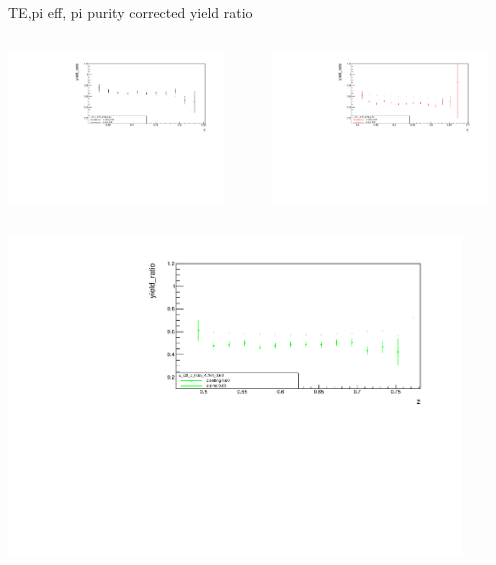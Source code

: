 \begin{frame}{TE,pi eff, pi purity corrected yield ratio}
\begin{columns}
\begin{column}[T]{0.5\textwidth}
\includegraphics[width = 0.9\textwidth]{results/yield/statistics_corr/x_Q2_z_55_4764_40_ratio.pdf}
\end{column}
\begin{column}[T]{0.5\textwidth}
\includegraphics[width = 0.9\textwidth]{results/yield/statistics_corr/x_Q2_z_55_4764_50_ratio.pdf}
\end{column}
\end{columns}
\begin{columns}
\begin{column}[T]{0.5\textwidth}
\includegraphics[width = 0.9\textwidth]{results/yield/statistics_corr/x_Q2_z_55_4764_60_ratio.pdf}

\end{column}
\end{columns}
\end{frame}
